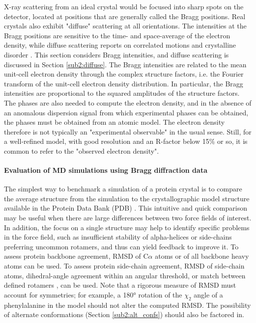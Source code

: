 \documentclass[9pt,review]{livecoms}
\begin{document}
X-ray scattering from an ideal crystal would be focused into sharp spots on the detector, located at positions that are generally called the Bragg positions.
Real crystals also exhibit "diffuse" scattering at all orientations.
The intensities at the Bragg positions are sensitive to the time- and space-average of the electron density, while diffuse scattering reports on correlated motions and crystalline disorder \cite{meisburger_x-ray_2017}.
This section considers Bragg intensities, and diffuse scattering is discussed in Section \ref{sub2:diffuse}.
The Bragg intensities are related to the mean unit-cell electron density through the complex structure factors, i.e. the Fourier transform of the unit-cell electron density distribution.
In particular, the Bragg intensities are proportional to the squared amplitudes of the structure factors.
The phases are also needed to compute the electron density, and in the absence of an anomalous dispersion signal from which experimental phases can be obtained, the phases must be obtained from an atomic model.
The electron density therefore is not typically an "experimental observable" in the usual sense.
Still, for a well-refined model, with good resolution and an R-factor below 15\% or so, it is common to refer to the "observed electron density".

\paragraph{Evaluation of MD simulations using Bragg diffraction data}

The simplest way to benchmark a simulation of a protein crystal is to compare the average structure from the simulation to the crystallographic model structure available in the Protein Data Bank (PDB) \cite{bernstein_protein_1977,berman_protein_2000,rose_rcsb_2015}.
This intuitive and quick comparison may be useful when there are large differences between two force fields of interest.
In addition, the focus on a single structure may help to identify specific problems in the force field, such as insufficient stability of alpha-helices or side-chains preferring uncommon rotamers, and thus can yield feedback to improve it.
To assess protein backbone agreement, RMSD of C$\alpha$ atoms or of all backbone heavy atoms can be used.
To assess protein side-chain agreement, RMSD of side-chain atoms, dihedral-angle agreement within an angular threshold, or match between defined rotamers \cite{dunbrack_backbone-dependent_1993}, can be used.
Note that a rigorous measure of RMSD must account for symmetries; for example, a \ang{180} rotation of the $\chi_2$ angle of a phenylalanine in the model should not alter the computed RMSD.
The possibility of alternate conformations (Section \ref{sub2:alt_confs}) should also be factored in.
\end{document}
